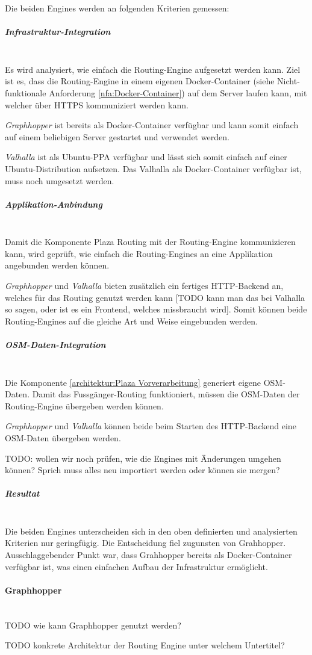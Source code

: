 Die beiden Engines werden an folgenden Kriterien gemessen:

\subparagraph{Infrastruktur-Integration}~\\
\label{architektur:Infrastruktur-Integration}
Es wird analysiert, wie einfach die Routing-Engine aufgesetzt werden kann. Ziel ist es, dass die Routing-Engine in einem eigenen Docker-Container (siehe Nicht-funktionale Anforderung \ref{nfa:Docker-Container}) auf dem Server laufen kann, mit welcher über HTTPS kommuniziert werden kann.

\emph{Graphhopper} ist bereits als Docker-Container verfügbar und kann somit einfach auf einem beliebigen Server gestartet und verwendet werden.

\emph{Valhalla} ist als Ubuntu-\ac{PPA} verfügbar und lässt sich somit einfach auf einer Ubuntu-Distribution aufsetzen. Das Valhalla als Docker-Container verfügbar ist, muss noch umgesetzt werden.

\subparagraph{Applikation-Anbindung}~\\
\label{architektur:Applikation-Anbindung}
Damit die Komponente Plaza Routing mit der Routing-Engine kommunizieren kann, wird geprüft, wie einfach die Routing-Engines an eine Applikation angebunden werden können. 

\emph{Graphhopper} und \emph{Valhalla} bieten zusätzlich ein fertiges HTTP-Backend an, welches für das Routing genutzt werden kann [TODO kann man das bei Valhalla so sagen, oder ist es ein Frontend, welches missbraucht wird]. Somit können beide Routing-Engines auf die gleiche Art und Weise eingebunden werden.

\subparagraph{OSM-Daten-Integration}~\\
\label{architektur:OSM-Daten-Integration}
Die Komponente \ref{architektur:Plaza Vorverarbeitung} generiert eigene \ac{OSM}-Daten. Damit das Fussgänger-Routing funktioniert, müssen die \ac{OSM}-Daten der Routing-Engine übergeben werden können. 

\emph{Graphhopper} und \emph{Valhalla} können beide beim Starten des HTTP-Backend eine {OSM}-Daten übergeben werden.

TODO: wollen wir noch prüfen, wie die Engines mit Änderungen umgehen können? Sprich muss alles neu importiert werden oder können sie mergen?

\subparagraph{Resultat}~\\
\label{architektur:Resulat}
Die beiden Engines unterscheiden sich in den oben definierten und analysierten Kriterien nur geringfügig. Die Entscheidung fiel zugunsten von Grahhopper. Ausschlaggebender Punkt war, dass Grahhopper bereits als Docker-Container verfügbar ist, was einen einfachen Aufbau der Infrastruktur ermöglicht.

\paragraph{Graphhopper}~\\
\label{architektur:Graphhopper}
TODO wie kann Graphhopper genutzt werden?


TODO konkrete Architektur der Routing Engine unter welchem Untertitel?

